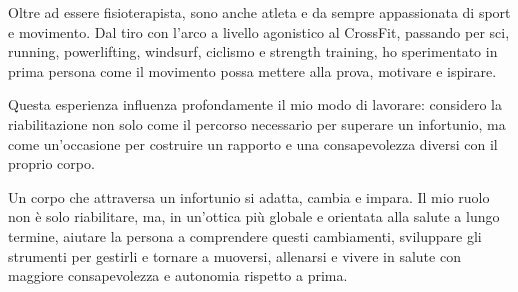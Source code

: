 \documentclass{pedricv}
\begin{document}
\begin{cvprose}
Oltre ad essere fisioterapista, sono anche atleta e da sempre appassionata di
sport e movimento. Dal tiro con l’arco a livello agonistico al CrossFit,
passando per sci, running, powerlifting, windsurf, ciclismo e strength
training, ho sperimentato in prima persona come il movimento possa mettere alla
prova, motivare e ispirare.

Questa esperienza influenza profondamente il mio modo di lavorare: considero la
riabilitazione non solo come il percorso necessario per superare un infortunio,
ma come un’occasione per costruire un rapporto e una consapevolezza diversi con
il proprio corpo.

Un corpo che attraversa un infortunio si adatta, cambia e impara. Il mio
ruolo non è solo riabilitare, ma, in un’ottica più globale e orientata alla
salute a lungo termine, aiutare la persona a comprendere questi cambiamenti,
sviluppare gli strumenti per gestirli e tornare a muoversi, allenarsi e vivere
in salute con maggiore consapevolezza e autonomia rispetto a prima.
\end{cvprose}

\cvprivacyline
\end{document}
